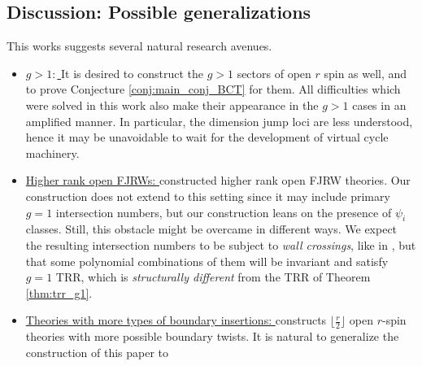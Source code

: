 \documentclass[11pt]{amsart}
\theoremstyle{definition}
\theoremstyle{remark}
\newcommand{\<}{\left<}
\renewcommand{\>}{\right>}
\numberwithin{equation}{section}
\begin{document}
\subsection{Discussion: Possible generalizations}
This works suggests several natural research avenues. 
\begin{itemize}
    \item \underline{$g>1:$ }It is desired to construct the $g>1$ sectors of open $r$ spin as well, and to prove Conjecture \ref{conj:main_conj_BCT} for them. All difficulties which were solved in this work also make their appearance in the %
$g>1$ cases in %
an amplified manner. %
In particular, the %
dimension jump loci are less understood, hence it may be unavoidable to wait for the development of virtual cycle machinery. 
    \item \underline{Higher rank open FJRWs: }\cite{GKT2} constructed higher rank open FJRW theories. Our construction does not extend to %
this setting since %
it may include primary $g=1$ intersection numbers, but our construction leans on the presence of $\psi_i$ classes. Still, this obstacle might be overcame in different ways. We expect the resulting intersection numbers to be subject to \emph{wall crossings}, like in \cite{GKT2}, but that some polynomial combinations of them will %
be invariant and %
satisfy $g=1$ TRR, which is \emph{structurally different} from the TRR of %
Theorem \ref{thm:trr_g1}.
    \item \underline{Theories with more types of boundary insertions: }\cite{TZ2} constructs %
$\lfloor\frac{r}{2}\rfloor$ open $r$-spin theories with more possible boundary twists. It is natural to generalize the construction of this paper to %

\end{itemize}
\end{document}

